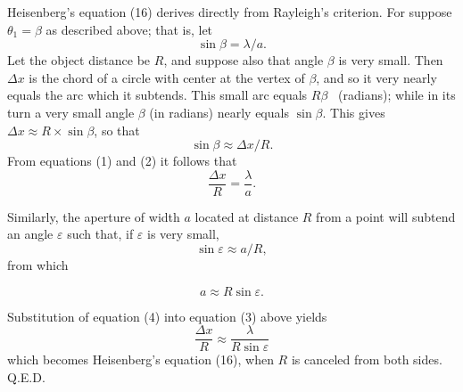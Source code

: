 Heisenberg's equation (16) derives directly from
Rayleigh's criterion. For suppose $\theta_1 = \beta$ as described
above; that is, let
%
\begin{equation}
\sin \beta = \lambda/a. %
\end{equation}
%
Let the object distance be $R$, and suppose also that angle
$\beta$ is very small. Then $\Delta x$ is the chord of a circle with
center at the vertex of $\beta$, and so it very nearly equals the arc
which it subtends. This small arc equals $R\beta$ \ (radians);
while in its turn a very small angle $\beta$ (in radians) nearly equals
$\sin \beta$. This gives $\Delta x \approx R \times \sin\beta$, so that
%
\begin{equation}
\sin \beta \approx \Delta x/R . %
\end{equation}
%
From equations (1) and (2) it follows that
%
\begin{equation}
\frac{\Delta x}{R} = \frac{\lambda}{a}. %
\end{equation}
%


Similarly, the aperture of width $a$ located at distance $R$
from a point will subtend an angle $\varepsilon$ such that, if $\varepsilon$ is
very small,
%
\begin{equation*}
\sin \varepsilon \approx a/R,
\end{equation*}
%
from which

\begin{equation}
a \approx R \sin \varepsilon. %
\end{equation}

Substitution of equation (4) into equation (3) above yields
%
\begin{equation*}
\frac{\Delta x}{R} \approx \frac{\lambda}{R \sin \varepsilon}
\end{equation*}
%
which becomes Heisenberg's equation (16), when $R$ is canceled from
both sides. Q.E.D.

